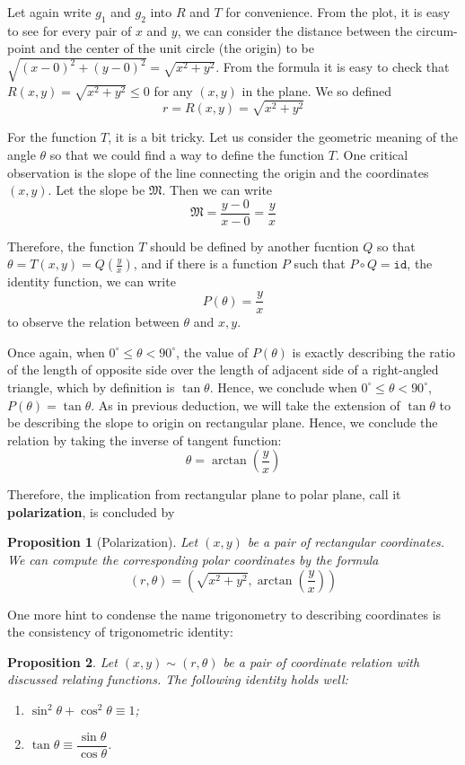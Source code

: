 \documentclass[12pt]{article}
\newcommand{\id}{\mathtt{id}}
\newtheorem*{proposition}{Proposition}
\begin{document}
    Let again write $g_1$ and $g_2$ into $R$ and $T$ for convenience. From the plot, it is easy to see for every pair of $x$ and $y$, we can consider the distance between the circum-point and the center of the unit circle (the origin) to be $\sqrt{(x-0)^2+(y-0)^2}=\sqrt{x^2+y^2}$. From the formula it is easy to check that $R(x,y)=\sqrt{x^2+y^2}\leq 0$ for any $(x,y)$ in the plane. We so defined \[r=R(x,y)=\sqrt{x^2+y^2}\]

    For the function $T$, it is a bit tricky. Let us consider the geometric meaning of the angle $\theta$ so that we could find a way to define the function $T$. One critical observation is the slope of the line connecting the origin and the coordinates $(x,y)$. Let the slope be $\mathfrak{M}$. Then we can write \[\mathfrak{M}=\frac{y-0}{x-0}=\frac{y}{x}\]

    Therefore, the function $T$ should be defined by another fucntion $Q$ so that $\theta=T(x,y)=Q(\frac{y}{x})$, and if there is a function $P$ such that $P\circ Q = \id$, the identity function, we can write $$P(\theta)=\frac{y}{x}$$ to observe the relation between $\theta$ and $x,y$.

    Once again, when $0^\circ \leq \theta < 90^\circ$, the value of $P(\theta)$ is exactly describing the ratio of the length of opposite side over the length of adjacent side of a right-angled triangle, which by definition is $\tan{\theta}$. Hence, we conclude when $0^\circ \leq \theta < 90^\circ$, $P(\theta)=\tan{\theta}$. As in previous deduction, we will take the extension of $\tan{\theta}$ to be describing the slope to origin on rectangular plane. Hence, we conclude the relation by taking the inverse of tangent function: \[\theta=\arctan(\frac{y}{x})\]

    Therefore, the implication from rectangular plane to polar plane, call it \textbf{polarization}, is concluded by 

    \begin{proposition}[Polarization]
        Let $(x,y)$ be a pair of rectangular coordinates. We can compute the corresponding polar coordinates by the formula \[(r,\theta)=(\sqrt{x^2+y^2},\arctan(\frac{y}{x}))\]
    \end{proposition}

    One more hint to condense the name trigonometry to describing coordinates is the consistency of trigonometric identity:

    \begin{proposition}
        Let $(x,y)\sim(r,\theta)$ be a pair of coordinate relation with discussed relating functions. The following identity holds well: \begin{enumerate}
            \item $\sin^2{\theta}+\cos^2{\theta}\equiv 1$;
            \item $\tan{\theta}\equiv\dfrac{\sin{\theta}}{\cos{\theta}}$.
        \end{enumerate}
    \end{proposition}
    
\end{document}
